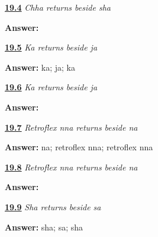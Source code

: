 \noindent\begin{minipage}[t]{\linewidth}
\raggedright
\hyperlink{review-GU-R15-chha-r4-dictation}{\textbf{19.4}} \emph{Chha returns beside sha}\par
\small \textbf{Answer:}   \par
\end{minipage}\par\medskip

\noindent\begin{minipage}[t]{\linewidth}
\raggedright
\hyperlink{review-GU-R15-ka-r4-reading}{\textbf{19.5}} \emph{Ka returns beside ja}\par
\small \textbf{Answer:} ka; ja; ka\par
\end{minipage}\par\medskip

\noindent\begin{minipage}[t]{\linewidth}
\raggedright
\hyperlink{review-GU-R15-ka-r4-dictation}{\textbf{19.6}} \emph{Ka returns beside ja}\par
\small \textbf{Answer:}   \par
\end{minipage}\par\medskip

\noindent\begin{minipage}[t]{\linewidth}
\raggedright
\hyperlink{review-GU-R15-nna-r4-reading}{\textbf{19.7}} \emph{Retroflex nna returns beside na}\par
\small \textbf{Answer:} na; retroflex nna; retroflex nna\par
\end{minipage}\par\medskip

\noindent\begin{minipage}[t]{\linewidth}
\raggedright
\hyperlink{review-GU-R15-nna-r4-dictation}{\textbf{19.8}} \emph{Retroflex nna returns beside na}\par
\small \textbf{Answer:}   \par
\end{minipage}\par\medskip

\noindent\begin{minipage}[t]{\linewidth}
\raggedright
\hyperlink{review-GU-R15-sha-r4-reading}{\textbf{19.9}} \emph{Sha returns beside sa}\par
\small \textbf{Answer:} sha; sa; sha\par
\end{minipage}\par\medskip

